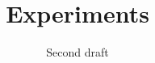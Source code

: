\documentclass[a4paper,english]{report}
\begin{document}
\title{Experiments}
\subtitle{Second draft}

\maketitle


%

\end{document}
